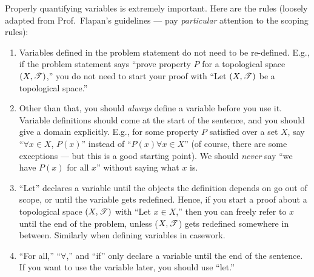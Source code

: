 \documentclass{fkpset}
\begin{document}
\begin{problem}[A2]
  Properly quantifying variables is extremely important. Here are the rules
  (loosely adapted from Prof.\ Flapan's guidelines --- pay \emph{particular}
  attention to the scoping rules):\vspace{1em}
  \begin{enumerate}[label=(\arabic*)]
    \item Variables defined in the problem statement do not need to be
      re-defined. E.g., if the problem statement says ``prove property $P$ for a
      topological space $(X, \mathscr{T})$,'' you do not need to start your proof with
      ``Let $(X,\mathscr{T})$ be a topological space.''\vspace{.5em}
    \item Other than that, you should \emph{always} define a variable before you
      use it. Variable definitions should come at the start of the sentence, and
      you should give a domain explicitly. E.g., for some property $P$ satisfied
      over a set $X$, say ``$\forall x \in X$, $P(x)$'' instead of ``$P(x)
      \forall x \in X$'' (of course, there are some exceptions --- but this is a
      good starting point). We should \emph{never} say ``we have $P(x)$ for all
      $x$'' without saying what $x$ is.\vspace{.5em}
    \item ``Let'' declares a variable until the objects the definition depends
      on go out of scope, or until the variable gets redefined. Hence, if you
      start a proof about a topological space $(X,\mathscr{T})$ with ``Let $x \in
      X$,'' then you can freely refer to $x$ until the end of the problem,
      unless ($X, \mathscr{T}$) gets redefined somewhere in between. Similarly when
      defining variables in casework.\vspace{.5em}
    \item ``For all,'' ``$\forall$,'' and ``if'' only declare a variable until
      the end of the sentence. If you want to use the variable later, you should
      use ``let.''\\


\end{enumerate}
\end{problem}
\end{document}
